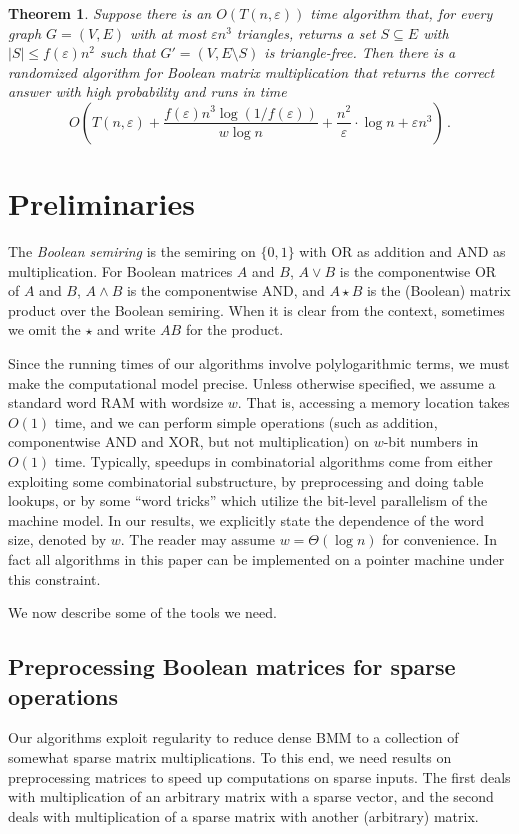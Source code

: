\documentclass[10pt]{article}
\newtheorem{theorem}{Theorem}[section]
\theoremstyle{definition}
\numberwithin{equation}{section}
\newcommand{\eps}{\varepsilon}
\begin{document}
\begin{theorem} \label{boolmmtriangles} Suppose there is an $O(T(n,\eps))$ time algorithm that, for every graph $G=(V,E)$ with at most $\eps n^3$ triangles, returns a set $S \subseteq E$ with $|S| \leq f(\eps) n^2$ such that $G'=(V,E\setminus S)$ is triangle-free. Then there is a randomized algorithm for Boolean matrix multiplication that returns the correct answer with high probability and runs in time
%
 \[
O\left(T(n,\eps) + \frac{f(\eps) n^3 \log (1/f(\eps))}{w \log n} + \frac{n^2}{\eps} \cdot \log n + \eps n^3\right)\,.
\]
%
\end{theorem}
\setcounter{section}{2}
\section{Preliminaries}
The \emph{Boolean semiring} is the semiring on $\{0,1\}$ with OR as addition and AND as multiplication. For Boolean matrices $A$ and $B$, $A \vee B$ is the componentwise OR of $A$ and $B$, $A \wedge B$ is the componentwise AND, and $A \star B$ is the (Boolean) matrix product over the Boolean semiring. When it is clear from the context, sometimes we omit the $\star$ and write $A B$ for the product.

Since the running times of our algorithms involve polylogarithmic terms, we must make the computational model precise. Unless otherwise specified, we assume a standard word RAM with wordsize $w$. That is, accessing a memory location takes $O(1)$ time, and we can perform simple operations (such as addition, componentwise AND and XOR, but not multiplication) on $w$-bit numbers in $O(1)$ time.
Typically, speedups in combinatorial algorithms come from either exploiting some combinatorial substructure, by preprocessing and doing table lookups, or by some ``word tricks'' which utilize the bit-level parallelism of the machine model.
In our results, we explicitly state the dependence of the word size, denoted by $w$. The reader may assume $w = \Theta(\log n)$ for convenience. In fact all algorithms in this paper can be implemented on a pointer machine under this constraint.

We now describe some of the tools we need.
\setcounter{subsection}{1}\setcounter{theorem}{6}
\subsection{Preprocessing Boolean matrices for sparse operations}

Our algorithms exploit regularity to reduce dense BMM to a collection of somewhat sparse matrix multiplications. To this end, we need results on preprocessing matrices to speed up computations on sparse inputs. The first deals with multiplication of an arbitrary matrix with a sparse vector, and the second deals with multiplication of a sparse matrix with another (arbitrary) matrix.
\end{document}
